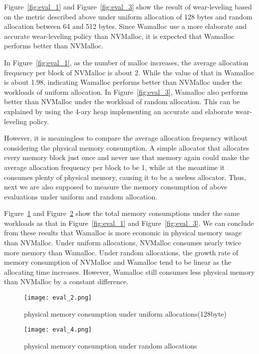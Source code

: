 \documentclass[10pt, conference, compsocconf]{IEEEtran}
\begin{document}
Figure~\ref{fig:eval_1} and Figure~\ref{fig:eval_3} show the result of wear-leveling based on the metric described above
under uniform allocation of 128 bytes and random allocation between 64 and 512 bytes.
Since Wamalloc use a more elaborate and accurate wear-leveling policy than NVMalloc,
it is expected that Wamalloc performs better than NVMalloc.


In Figure~\ref{fig:eval_1}, as the number of malloc increases,
the average allocation frequency per block of NVMalloc is about 2.
While the value of that in Wamalloc is about 1.98, 
indicating Wamalloc performs better than NVMalloc under the workloads of uniform allocation.
In Figure~\ref{fig:eval_3},
Wamalloc also performs better than NVMalloc under the workload of random allocation.
This can be explained by using the 4-ary heap implementing an accurate and elaborate wear-leveling policy.

However, it is meaningless to compare the average allocation frequency without considering the physical memory consumption.
A simple allocator that allocates every memory block just once and never use that memory again 
could make the average allocation frequency per block to be 1, 
while at the meantime it consumes plenty of physical memory, causing it to be a useless allocator.
Thus, next we are also supposed to measure the memory consumption of above evaluations under uniform and random allocation.

Figure~\ref{fig:eval_2} and Figure~\ref{fig:eval_4} show the total memory consumptions under the same workloads as that in Figure~\ref{fig:eval_1} and Figure~\ref{fig:eval_3}.
We can conclude from these results that 
Wamalloc is more economic in physical memory usage than NVMalloc.
Under uniform allocations, NVMalloc consumes nearly twice more memory than Wamalloc.
Under random allocations, the growth rate of memory consumption of NVMalloc and Wamalloc tend to be linear as the allocating time increases. 
However, Wamalloc still consumes less physical memory than NVMalloc by a constant difference.

\begin{figure}[t]
\centering
\texttt{[image: eval\_2.png]}
\caption{physical memory consumption under uniform allocations(128byte)}
\label{fig:eval_2}
\end{figure}

\begin{figure}[t]
\centering
\texttt{[image: eval\_4.png]}
\caption{physical memory consumption under random allocations}
\label{fig:eval_4}
\end{figure}
\end{document}
